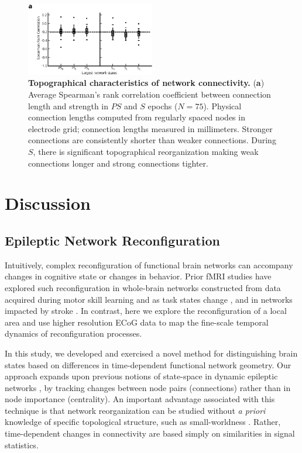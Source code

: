 \begin{figure}[H]
    \centering
    \includegraphics[width=0.5\textwidth]{panel6.eps}
\caption[Topographical characteristics of epileptic network connectivity]{\textbf{Topographical characteristics of network connectivity.} (\textbf{a}) Average Spearman's rank correlation coefficient between connection length and strength in $PS$ and $S$ epochs ($N=75$). Physical connection lengths computed from regularly spaced nodes in electrode grid; connection lengths measured in millimeters. Stronger connections are consistently shorter than weaker connections. During $S$, there is significant topographical reorganization making weak connections longer and strong connections tighter. \label{ch3:fig6}}
\end{figure}


\section{Discussion}
\subsection{Epileptic Network Reconfiguration}
Intuitively, complex reconfiguration of functional brain networks can accompany changes in cognitive state or changes in behavior. Prior fMRI studies have explored such reconfiguration in whole-brain networks constructed from data acquired during motor skill learning \cite{bassett2011dynamic} and as task states change \cite{bassett2006adaptive}, and in networks impacted by stroke \cite{wang2010dynamic, grefkes2011reorganization}. In contrast, here we explore the reconfiguration of a local area and use higher resolution ECoG data to map the fine-scale temporal dynamics of reconfiguration processes.

In this study, we developed and exercised a novel method for distinguishing brain states based on differences in time-dependent functional network geometry. Our approach expands upon previous notions of state-space in dynamic epileptic networks \cite{rummel2013systems-level, burns2014network}, by tracking changes between node pairs (connections) rather than in node importance (centrality). An important advantage associated with this technique is that network reorganization can be studied without \emph{a priori} knowledge of specific topological structure, such as small-worldness \cite{kramer2010coalescence}. Rather, time-dependent changes in connectivity are based simply on similarities in signal statistics.

